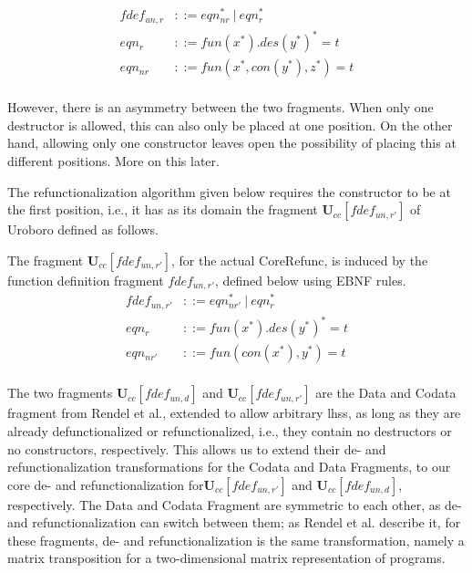 \begin{align*}
fdef_{un,r} &::= eqn_{nr}^* ~ | ~ eqn_r^* \\
eqn_r &::= fun(x^*).des(y^*)^* = t \\
eqn_{nr} &::= fun(x^*, con(y^*), z^*) = t \\
\end{align*}

However, there is an asymmetry between the two fragments. When only one destructor is allowed, this can also only be placed at one position. On the other hand, allowing only one constructor leaves open the possibility of placing this at different positions. More on this later.

The refunctionalization algorithm given below requires the constructor to be at the first position, i.e., it has as its domain the fragment $\mathbf{U}_{cc}[fdef_{un,r'}]$ of Uroboro defined as follows.

\begin{definition}
The fragment $\mathbf{U}_{cc}[fdef_{un,r'}]$, for the actual \textsf{CoreRefunc}, is induced by the function definition fragment $fdef_{un,r'}$, defined below using EBNF rules.
\begin{align*}
fdef_{un,r'} &::= eqn_{nr'}^* ~ | ~ eqn_r^* \\
eqn_r &::= fun(x^*).des(y^*)^* = t \\
eqn_{nr'} &::= fun(con(x^*), y^*) = t \\
\end{align*}
\end{definition}

The two fragments $\mathbf{U}_{cc}[fdef_{un,d}]$ and $\mathbf{U}_{cc}[fdef_{un,r'}]$ are the Data and Codata fragment from Rendel et al., extended to allow arbitrary lhss, as long as they are already defunctionalized or refunctionalized, i.e., they contain no destructors or no constructors, respectively. This allows us to extend their de- and refunctionalization transformations for the Codata and Data Fragments, to our core de- and refunctionalization for$\mathbf{U}_{cc}[fdef_{un,r'}]$ and $\mathbf{U}_{cc}[fdef_{un,d}]$, respectively. The Data and Codata Fragment are symmetric to each other, as de- and refunctionalization can switch between them; as Rendel et al.\cite{rendel15automatic} describe it, for these fragments, de- and refunctionalization is the same transformation, namely a matrix transposition for a two-dimensional matrix representation of programs.

